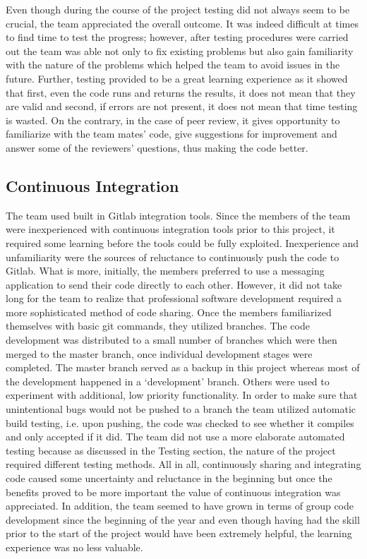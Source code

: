\documentclass{l3proj}
\begin{document}
Even though during the course of the project testing did not always seem to be crucial, the team appreciated the overall outcome. It was indeed difficult at times to find time to test the progress; however, after testing procedures were carried out the team was able not only to fix existing problems but also gain familiarity with the nature of the problems which helped the team to avoid issues in the future. Further, testing provided to be a great learning experience as it showed that first, even the code runs and returns the results, it does not mean that they are valid and second, if errors are not present, it does not mean that time testing is wasted. On the contrary, in the case of peer review, it gives opportunity to familiarize with the team mates’ code, give suggestions for improvement and answer some of the reviewers’ questions, thus making the code better.


\subsection{Continuous Integration}
The team used built in Gitlab integration tools. Since the members of the team were inexperienced with continuous integration tools prior to this project, it required some learning before the tools could be fully exploited. Inexperience and unfamiliarity were the sources of reluctance to continuously push the code to Gitlab. What is more, initially, the members preferred to use a messaging application to send their code directly to each other. However, it did not take long for the team to realize that professional software development required a more sophisticated method of code sharing.
Once the members familiarized themselves with basic git commands, they utilized branches. The code development was distributed to a small number of branches which were then merged to the master branch, once individual development stages were completed. The master branch served as a backup in this project whereas most of the development happened in a ‘development’ branch. Others were used to experiment with additional, low priority functionality.
In order to make sure that unintentional bugs would not be pushed to a branch the team utilized automatic build testing, i.e. upon pushing, the code was checked to see whether it compiles and only accepted if it did. The team did not use a more elaborate automated testing because as discussed in the Testing section, the nature of the project required different testing methods.
All in all, continuously sharing and integrating code caused some uncertainty and reluctance in the beginning but once the benefits proved to be more important the value of continuous integration was appreciated.  In addition, the team seemed to have grown in terms of group code development since the beginning of the year and even though having had the skill prior to the start of the project would have been extremely helpful, the learning experience was no less valuable.
\end{document}
